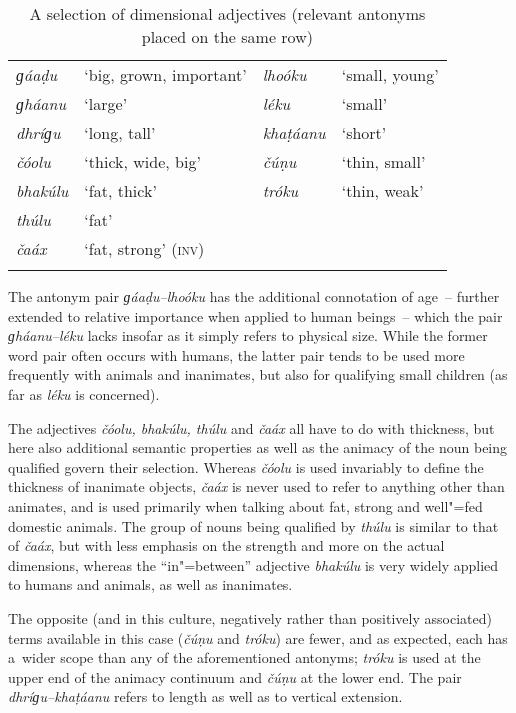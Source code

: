 \begin{table} 
\caption{A selection of dimensional adjectives (relevant antonyms placed on the same row)}
\begin{tabularx}{\textwidth}{ l Q l Q }
\lsptoprule
\textit{ɡáaḍu} &
`big, grown, important' &
\textit{lhoóku} &
`small, young'\\
\textit{ɡháanu} &
`large' &
\textit{léku} &
`small'\\
\textit{dhríɡu} &
`long, tall' &
\textit{khaṭáanu} &
`short'\\
\textit{čóolu} &
`thick, wide, big' &
\textit{čúṇu} &
`thin, small'\\
\textit{bhakúlu} &
`fat, thick' &
\textit{tróku} &
`thin, weak'\\
\textit{thúlu} &
`fat' &
&
\\
\textit{čaáx} &
`fat, strong' (\textsc{inv)} &
&
\\\lspbottomrule
\end{tabularx}
\label{tab:6-dim}
\end{table}


The antonym pair \textit{ɡáaḍu--lhoóku} has the additional connotation of age~-- further extended to relative importance when applied to human beings~-- which the pair \textit{ɡháanu--léku} lacks insofar as it simply refers to physical size. While the former word pair often occurs with humans, the latter pair tends to be used more frequently with animals and inanimates, but also for qualifying small children (as far as \textit{léku} is concerned).


\largerpage[-1]

The adjectives \textit{čóolu, bhakúlu, thúlu} and \textit{čaáx} all have to do with thickness, but here also additional semantic properties as well as the animacy of the noun being qualified govern their selection. Whereas \textit{čóolu} is used invariably to define the thickness of inanimate objects, \textit{čaáx} is never used to refer to anything other than animates, and is used primarily when talking about fat, strong and well"=fed domestic animals. The group of nouns being qualified by \textit{thúlu} is similar to that of \textit{čaáx}, but with less emphasis on the strength and more on the actual dimensions, whereas the ``in"=between'' adjective \textit{bhakúlu} is very widely applied to humans and animals, as well as inanimates. 



The opposite (and in this culture, negatively rather than positively associated) terms available in this case (\textit{čúṇu} and \textit{tróku}) are fewer, and as expected, each has a~wider scope than any of the aforementioned antonyms; \textit{tróku} is used at the upper end of the animacy continuum and \textit{čúṇu} at the lower end. The pair \textit{dhríɡu--khaṭáanu} refers to length as well as to vertical extension.


